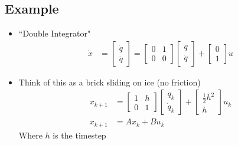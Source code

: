 \documentclass[11pt]{article}
\begin{document}
\subsection{Example}
\begin{itemize}
    \item ``Double Integrator"
    \begin{align*}
        \dot{x} &= \begin{bmatrix}
            \dot{q} \\
            \ddot{q}
        \end{bmatrix}
        =
        \begin{bmatrix}
            0 & 1 \\
            0 & 0 
        \end{bmatrix}
        \begin{bmatrix}
            q \\
            \dot{q}
        \end{bmatrix}
        + \begin{bmatrix}
            0 \\
            1
        \end{bmatrix}
        u
    \end{align*}
    \item Think of this as a brick sliding on ice (no friction)
    \begin{align*}
        x_{k+1} &= 
        \begin{bmatrix}
            1 & h \\
            0 & 1
        \end{bmatrix}
        \begin{bmatrix}
            q_k \\
            \dot{q}_k
        \end{bmatrix}
        +
        \begin{bmatrix}
            \frac{1}{2}h^2 \\
            h
        \end{bmatrix}
        u_k
        \\
        x_{k+1} &= Ax_k + Bu_k
    \end{align*}
    Where $h$ is the timestep
\end{itemize}
\end{document}
